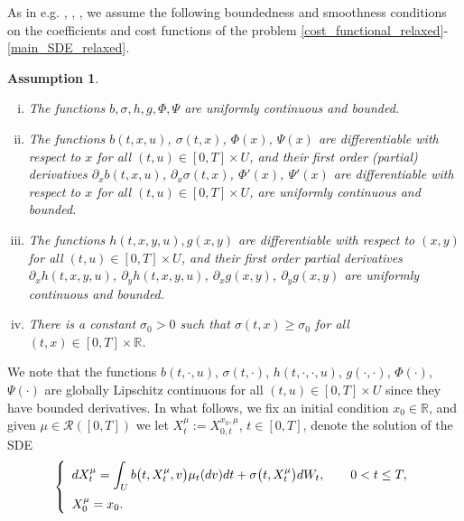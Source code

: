 \documentclass[12pt]{article}
\newtheorem{assumption}{Assumption}
\theoremstyle{named}
\numberwithin{equation}{section}
\newcommand{\real}{\mathbb{R}}
\let\oldcitet=\citet
\renewcommand{\cite}[1]{\textcolor[rgb]{0,0,1}{\oldcitet{#1}}}
\renewcommand{\citet}[1]{\textcolor[rgb]{0,0,1}{\oldcitet{#1}}}
\begin{document}
\noindent
 As in e.g.
\cite{kushner2013numerical},
\cite{buckdahn2011general},
\cite{djehiche2016characterization}
\cite{bahlali2018relaxed},
we assume the following boundedness and smoothness conditions on the
coefficients and cost functions of the problem
\eqref{cost_functional_relaxed}-\eqref{main_SDE_relaxed}.
\begin{assumption}
\begin{enumerate}[i)]
\item The functions $b, \sigma, h, g, \Phi, \Psi$ are uniformly continuous
        and bounded.
  \item The functions
    $b(t,x,u)$,
    $\sigma(t,x)$,
    $\Phi(x)$,
    $\Psi(x)$ are differentiable with respect to $x$ for all $(t, u)\in [0,T]\times U$,
    and their first order (partial) derivatives
 $\partial_x b(t,x,u)$,
    $\partial_x \sigma(t,x)$,
    $\Phi' (x)$,
    $\Psi' (x)$ are differentiable with respect to $x$ for all $(t, u)\in [0,T]\times U$,
    are uniformly continuous and bounded.
  \item The functions $h(t,x,y,u), g(x,y)$ are differentiable with respect to
    $( x, y )$ for all $(t, u)\in [0,T]\times U$,
    and their first order partial derivatives
    $\partial_x h(t,x,y,u)$,
    $\partial_y h(t,x,y,u)$,
    $\partial_x g(x,y)$,
    $\partial_y g(x,y)$
    are uniformly continuous and bounded.
\item There is a constant $\sigma_0 > 0$ such that $\sigma(t,x) \geq \sigma_0$ for all $(t, x)\in [0,T] \times \real$.
\end{enumerate}
\label{basic assumptions}
\end{assumption}
\noindent
We note that the functions $b(t,\cdot ,u)$,
$\sigma(t,\cdot )$,
$h(t,\cdot ,\cdot ,u)$,
$g(\cdot ,\cdot )$,
$\Phi(\cdot )$,
 $\Psi(\cdot )$ are
globally Lipschitz continuous for all $(t, u)\in [0,T]\times U$
since they have bounded derivatives. In what follows, we fix an initial condition
$x_0\in \real$,
and given $\mu \in \mathcal{R}([0,T])$ we
let $X^\mu_t:=X^{x_0 , \mu}_{0,t}$, $t\in [0,T]$,
 denote the solution of the SDE
\begin{equation}\label{main_SDE_relaxed_equilibrium}
  \left\{
  \begin{array}{l}
  \displaystyle
  dX^\mu_t = \int_U b\bigl(t,X^\mu_t,v\bigr) \mu_t(dv) dt + \sigma\bigl(t,X^\mu_t\bigr) dW_t, \qquad 0<t \leq T,
\medskip
\\
X^\mu_0 = x_0.
  \end{array}
  \right.
\end{equation}
\end{document}

